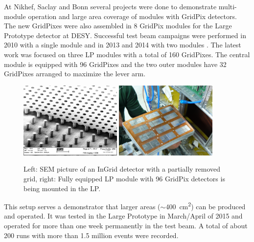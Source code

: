 At Nikhef, Saclay and Bonn several projects were done to demonstrate
multi-module operation and large area coverage of modules with GridPix
detectors. The new GridPixes were also assembled in 8
GridPix modules for the Large Prototype detector at DESY. Successful test beam
campaigns were performed in 2010 with a single module and in 2013 and 2014
with two modules
\cite{1748-0221-9-01-C01033}. The latest work was focused on three LP modules
with a total of 160 GridPixes. The central module is equipped with 96
GridPixes and the two outer modules have 32 GridPixes arranged to maximize the
lever arm.
\begin{figure}[!t]
  \centering
  \includegraphics[width=0.45\textwidth]{Tracker/TPC_Bonn/plots/TPC_pixels_GridPix.png}
  \includegraphics[width=0.45\textwidth]{Tracker/TPC_Bonn/plots/TPC_pixel_complete_module.png}
  \caption{Left: SEM picture of an InGrid detector with a partially removed
    grid, right: Fully equipped LP module with 96 GridPix detectors is being
    mounted in the LP.}
  \label{fig_TPC_pixels_1}
\end{figure}

This setup serves a demonstrator that larger areas ($\sim$\SI{400}{\centi\meter\squared}) can be produced and operated. It was tested in the Large Prototype in
March/April of 2015 and operated for more than one week permanently in the
test beam. A total of about 200 runs with more than 1.5 million events were recorded.

